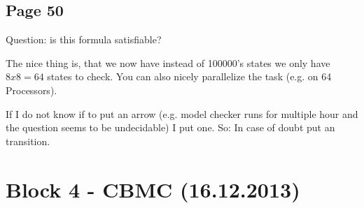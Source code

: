 \documentclass[a4paper]{article}
\begin{document}
\subsection{Page 50}
Question: is this formula satisfiable?

The nice thing is, that we now have instead of 100000's states we only have
$8x8=64$ states to check. You can also nicely parallelize the task (e.g. on 64
Processors).

If I do not know if to put an arrow (e.g. model checker runs for multiple hour
and the question seems to be undecidable) I put one. So: In case of doubt put an
transition.





\section{Block 4 - CBMC (16.12.2013)}
\end{document}
